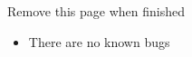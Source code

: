 \listoftodos
 Remove this page when finished
\begin{itemize}
    \item There are no known bugs
\end{itemize}

\newpage